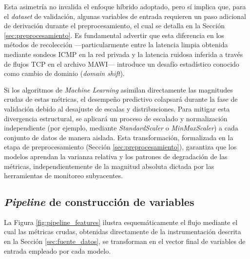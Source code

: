 \documentclass[12pt]{report}
\begin{document}
Esta asimetría no invalida el enfoque híbrido adoptado, pero sí implica que, para el \textit{dataset} de validación, algunas variables de entrada requieren un paso adicional de derivación durante el preprocesamiento, el cual se detalla en la Sección \ref{sec:preprocesamiento}. Es fundamental advertir que esta diferencia en los métodos de recolección ---particularmente entre la latencia limpia obtenida mediante sondeos ICMP en la red privada y la latencia ruidosa inferida a través de flujos TCP en el archivo MAWI--- introduce un desafío estadístico conocido 
como cambio de dominio (\textit{domain shift}). 

Si los algoritmos de \textit{Machine Learning} asimilan directamente las magnitudes crudas de estas métricas, el desempeño predictivo colapsará durante la fase de validación debido al desajuste de escalas y distribuciones. Para mitigar esta divergencia estructural, se aplicará un proceso de escalado y normalización independiente (por ejemplo, mediante \textit{StandardScaler} o \textit{MinMaxScaler}) a cada conjunto de datos de manera aislada. Esta transformación, formalizada en la etapa de preprocesamiento (Sección \ref{sec:preprocesamiento}), 
garantiza que los modelos aprendan la varianza relativa y los patrones de degradación de las métricas, independientemente de la magnitud absoluta dictada por las herramientas de monitoreo subyacentes.

\subsection*{\textit{Pipeline} de construcción de variables}

La Figura \ref{fig:pipeline_features} ilustra esquemáticamente el flujo mediante el cual las métricas crudas, obtenidas directamente de la instrumentación descrita en la Sección \ref{sec:fuente_datos}, se transforman en el vector final de variables de entrada empleado por cada modelo.
\end{document}
